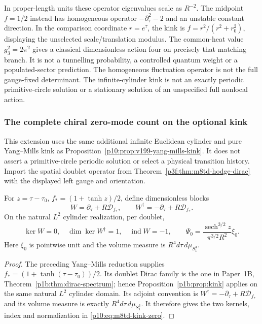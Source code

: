 \documentclass[12pt,a4paper]{article}
\begin{document}
In proper-length units these operator eigenvalues scale as \(R^{-2}\).
The midpoint \(f=1/2\) instead has homogeneous operator
\(-\partial_\tau^2-2\) and an unstable constant direction.
In the comparison coordinate \(r=e^\tau\), the kink is
\(f=r^2/(r^2+r_0^2)\), displaying the unselected scale/translation modulus.
The common-heat value \(g_3^2=2\pi^2\) gives a classical dimensionless
action four on precisely that matching branch.  It is not a tunnelling
probability, a controlled quantum weight or a populated-sector prediction.
The homogeneous fluctuation operator is not the full gauge-fixed determinant.
The infinite-cylinder kink is not an exactly periodic primitive-circle
solution or a stationary solution of an unspecified full nonlocal action.


\subsubsection{The complete chiral zero-mode count on the optional kink}
\label{p10:app:m8td-kink-dirac}
This extension uses the same additional infinite Euclidean cylinder and
pure Yang--Mills kink as Proposition~\ref{p10:prop:v199-yang-mills-kink}.
It does not assert a primitive-circle periodic solution or select a
physical transition history. Import the spatial doublet operator from
Theorem~\ref{p3f:thm:m8td-hodge-dirac} with the displayed left gauge and
orientation.

\begin{proposition}
\label{p10:prop:m8td-kink-zero}
For $z=\tau-\tau_0$, $f_*=(1+\tanh z)/2$, define dimensionless blocks
\[
 W=\partial_\tau+R\mathcal D_{f_*},\qquad
 W^\dagger=-\partial_\tau+R\mathcal D_{f_*}.
\]
On the natural $L^2$ cylinder realization, per doublet,
\begin{equation}
 \ker W=0,\quad\dim\ker W^\dagger=1,\quad\operatorname{ind}W=-1,
 \qquad
 \Psi_0=\frac{\operatorname{sech}^{3/2}z}{\pi^{3/2}R^2}\xi_0.
 \label{p10:eq:m8td-kink-zero}
\end{equation}
Here $\xi_0$ is pointwise unit and the volume measure is
$R^4d\tau\,d\mu_{S_1^3}$.
\end{proposition}
\begin{proof}
The preceding Yang--Mills reduction supplies
$f_*=(1+\tanh(\tau-\tau_0))/2$. Its doublet Dirac family is the
one in Paper~1B, Theorem~\ref{p1b:thm:dirac-spectrum}; hence
Proposition~\ref{p1b:prop:kink} \cite{Kugelmann2026Paper1B}
applies on the same natural $L^2$ cylinder domain. Its adjoint convention
is $W^\dagger=-\partial_\tau+R\mathcal D_{f_*}$ and its volume measure
is exactly $R^4d\tau\,d\mu_{S_1^3}$. It therefore gives the two
kernels, index and normalization in \eqref{p10:eq:m8td-kink-zero}.
\end{proof}
\end{document}
